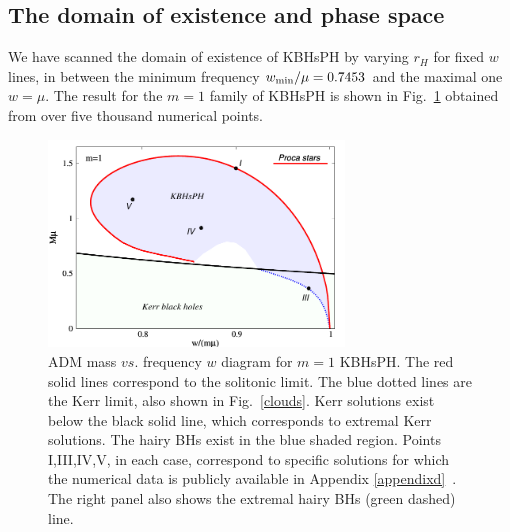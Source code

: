 \subsection{The domain of existence and phase space}
\label{subsec_III}
We have scanned the domain of existence of KBHsPH by varying $r_H$ for fixed $w$ lines, 
in between the minimum frequency 
$w_{\rm min}/\mu=0.7453$ and the maximal one $w=\mu$. 
The result for the $m=1$ family of KBHsPH is shown in Fig.~\ref{figdomain} obtained from over five thousand numerical points. 


%
\begin{figure}[h!]
  \begin{center}
    \includegraphics[width=0.7\textwidth]{papers/Proca/BH-w-M-with-points.pdf}
  \end{center}
  \caption{ADM mass $vs.$ frequency $w$ diagram for $m=1$ KBHsPH. The red solid lines correspond to the solitonic limit. The blue dotted lines are the Kerr limit, also shown in Fig.~\ref{clouds}. Kerr solutions exist below the black solid line, which corresponds to extremal Kerr solutions. The hairy BHs exist in the blue shaded region. Points I,III,IV,V, in each case, correspond to specific solutions for which the numerical data is publicly available in Appendix \ref{appendixd}~\cite{datakbhph,datakbhsh}. The right panel also shows the extremal hairy BHs (green dashed) line.}
  \label{figdomain}
\end{figure}
%

